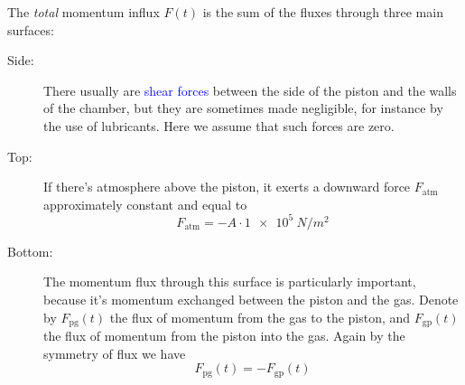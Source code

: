 \documentclass[a4paper,12pt,%
onecolumn,oneside,%
british%
]{memoir}
\renewcommand*{\|}[1][]{\nonscript\:#1\vert\nonscript\:\mathopen{}}
\newcommand*{\sect}{\S}%
\renewcommand*{\autoref}[2]{\sidepar{\vspace{-1ex}\footnotesize{\color{blue}\faIcon{%
angle-right%
}\enspace\sect~\ref{#1} page~\pageref{#1}}}\textcolor{blue}{#2}}
\newcommand*{\yFpg}{F_{\text{pg}}}
\newcommand*{\yFgp}{F_{\text{gp}}}
\newcommand*{\yFatm}{F_{\text{atm}}}
\begin{document}
The \emph{total} momentum influx $F(t)$ is the sum of the fluxes through three main surfaces:
\begin{description}
\item[Side:] There usually are \autoref{sec:shear}{shear forces} between the side of the piston and the walls of the chamber, but they are sometimes made negligible, for instance by the use of lubricants. Here we assume that such forces are zero.

\item[Top:] If there's atmosphere above the piston, it exerts a downward force $\yFatm$ approximately constant and equal to
  \begin{equation}
    \label{eq:gas_piston_Fatm}
    \yFatm = - A\cdot\qty[print-unity-mantissa=false]{1e5}{N/m^{2}}
  \end{equation}

\item[Bottom:] The momentum flux through this surface is particularly important, because it's momentum exchanged between the piston and the gas. Denote by $\yFpg(t)$ the flux of momentum from the gas to the piston, and $\yFgp(t)$ the flux of momentum from the piston into the gas. Again by the symmetry of flux we have
  \begin{equation*}
    \yFpg(t) = -\yFgp(t)
  \end{equation*}
%
%


\end{description}
\end{document}
